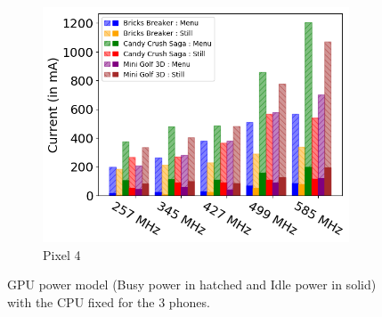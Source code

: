\begin{figure}[tp]
    \begin{subfigure}[b]{0.32\textwidth}
         \centering
         \includegraphics[width=\textwidth]{figures/004_Pixel4_gpu_model.png}
         \caption{Pixel 4}
         \label{fig:number_parameters_vs_duration_100s_200}
     \end{subfigure}
     \hfill
    \caption{GPU power model (Busy power in hatched and Idle power in solid) with the CPU fixed for the 3 phones.}
    \label{fig:gpu_model}
    \vspace{-0.1in}
\end{figure}

